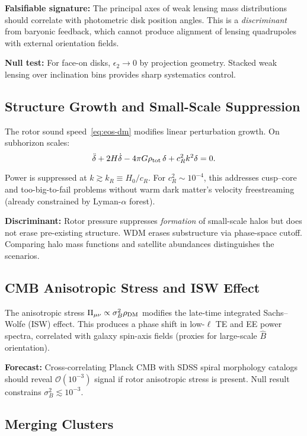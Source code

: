 \documentclass[11pt,a4paper]{article}
\numberwithin{equation}{section}
\theoremstyle{plain}
\theoremstyle{definition}
\theoremstyle{remark}
\begin{document}
\textbf{Falsifiable signature:} The principal axes of weak lensing mass distributions should correlate with photometric disk position angles. This is a \emph{discriminant} from baryonic feedback, which cannot produce alignment of lensing quadrupoles with external orientation fields.

\textbf{Null test:} For face-on disks, $\epsilon_2\to 0$ by projection geometry. Stacked weak lensing over inclination bins provides sharp systematics control.

\subsection{Structure Growth and Small-Scale Suppression}

The rotor sound speed~\eqref{eq:eos-dm} modifies linear perturbation growth. On subhorizon scales:
\begin{equation}
\ddot\delta + 2H\dot\delta - 4\pi G \rho_{\rm tot}\,\delta + c_R^2 k^2 \delta = 0.
\label{eq:pert-growth}
\end{equation}

Power is suppressed at $k\gtrsim k_R\equiv H_0/c_R$. For $c_R^2\sim 10^{-4}$, this addresses cusp--core and too-big-to-fail problems without warm dark matter's velocity freestreaming (already constrained by Lyman-$\alpha$ forest).

\textbf{Discriminant:} Rotor pressure suppresses \emph{formation} of small-scale halos but does not erase pre-existing structure. WDM erases substructure via phase-space cutoff. Comparing halo mass functions and satellite abundances distinguishes the scenarios.

\subsection{CMB Anisotropic Stress and ISW Effect}

The anisotropic stress $\Pi_{\mu\nu}\propto\sigma_B^2 \rho_{\rm DM}$ modifies the late-time integrated Sachs--Wolfe (ISW) effect. This produces a phase shift in low-$\ell$ TE and EE power spectra, correlated with galaxy spin-axis fields (proxies for large-scale $\hat B$ orientation).

\textbf{Forecast:} Cross-correlating Planck CMB with SDSS spiral morphology catalogs should reveal $\mathcal{O}(10^{-3})$ signal if rotor anisotropic stress is present. Null result constrains $\sigma_B^2\lesssim 10^{-3}$.

\subsection{Merging Clusters}
\end{document}
